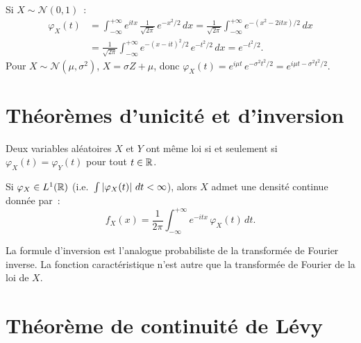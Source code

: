 \begin{exemple}
Si $X \sim \mathcal{N}(0,1)$~:
\begin{align*}
    \varphi_X(t) &= \int_{-\infty}^{+\infty} e^{itx}\, \frac{1}{\sqrt{2\pi}}\, e^{-x^2/2}\, dx
    = \frac{1}{\sqrt{2\pi}} \int_{-\infty}^{+\infty} e^{-(x^2 - 2itx)/2}\, dx \\
    &= \frac{1}{\sqrt{2\pi}} \int_{-\infty}^{+\infty}
    e^{-(x-it)^2/2}\, e^{-t^2/2}\, dx
    = e^{-t^2/2}.
\end{align*}
Pour $X \sim \mathcal{N}(\mu, \sigma^2)$, $X = \sigma Z + \mu$, donc
$\varphi_X(t) = e^{i\mu t}\, e^{-\sigma^2 t^2/2} = e^{i\mu t - \sigma^2 t^2/2}$.
\end{exemple}

\section{Th\'eor\`emes d'unicit\'e et d'inversion}

\begin{theoreme}
\label{thm:unicite}
Deux variables al\'eatoires $X$ et $Y$ ont m\^eme loi si et seulement si
$\varphi_X(t) = \varphi_Y(t)$ pour tout $t \in \mathbb{R}$.
\end{theoreme}

\begin{theoreme}
\label{thm:inversion}
Si $\varphi_X \in L^1(\mathbb{R})$ (i.e.\ $\int \left| \varphi_X(t) \right|\, dt < \infty$),
alors $X$ admet une densit\'e continue donn\'ee par~:
\[
    f_X(x) = \frac{1}{2\pi} \int_{-\infty}^{+\infty} e^{-itx}\, \varphi_X(t)\, dt.
\]
\end{theoreme}

\begin{remarque}
La formule d'inversion est l'analogue probabiliste de la transform\'ee de Fourier
inverse. La fonction caract\'eristique n'est autre que la transform\'ee de Fourier
de la loi de $X$.
\end{remarque}

\section{Th\'eor\`eme de continuit\'e de L\'evy}

